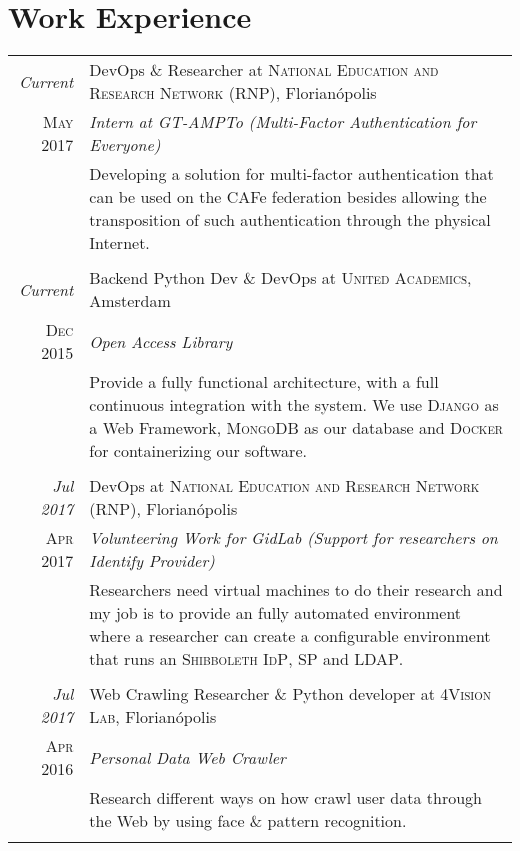 \documentclass[a4paper,10pt]{article}
\begin{document}
\section{Work Experience}
\begin{longtable}{r|p{11cm}}

\emph{Current} & DevOps \& Researcher at \textsc{National Education and Research Network (RNP)}, Florianópolis \\\textsc{May 2017} & \emph{Intern at GT-AMPTo (Multi-Factor Authentication for Everyone)}\\&\footnotesize{Developing a solution for multi-factor authentication that can be used on the CAFe federation besides allowing the transposition of such authentication through the physical Internet.}\\\multicolumn{2}{c}{} \\

\emph{Current} & Backend Python Dev \& DevOps at \textsc{United Academics}, Amsterdam \\\textsc{Dec 2015} & \emph{Open Access Library}\\&\footnotesize{Provide a fully functional architecture, with a full continuous integration with the system. We use \textsc{Django} as a Web Framework, \textsc{MongoDB} as our database and \textsc{Docker} for containerizing our software.}\\\multicolumn{2}{c}{} \\

\emph{Jul 2017} & DevOps at \textsc{National Education and Research Network (RNP)}, Florianópolis \\\textsc{Apr 2017} & \emph{Volunteering Work for GidLab (Support for researchers on Identify Provider)}\\&\footnotesize{Researchers need virtual machines to do their research and my job is to provide an fully automated environment where a researcher can create a configurable environment that runs an \textsc{Shibboleth} \textsc{IdP}, \textsc{SP} and \textsc{LDAP}.}\\\multicolumn{2}{c}{} \\

\emph{Jul 2017} & Web Crawling Researcher \& Python developer at \textsc{4Vision Lab}, Florianópolis \\\textsc{Apr 2016} & \emph{Personal Data Web Crawler}\\&\footnotesize{Research different ways on how crawl user data through the Web by using face \& pattern recognition.}\\\multicolumn{2}{c}{} \\


\end{longtable}
\end{document}

